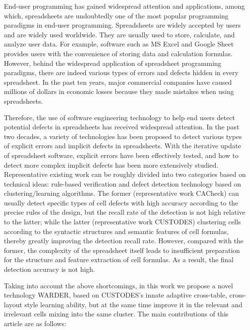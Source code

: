 \begin{englishabstract}

End-user programming has gained widespread attention and applications, among which, spreadsheets are undoubtedly one of the most popular programming paradigms in end-user programming.
Spreadsheets are widely accepted by users and are widely used worldwide. 
They are usually used to store, calculate, and analyze user data. 
For example, software such as MS Excel and Google Sheet provides users with the convenience of storing data and calculation formulas. 
However, behind the widespread application of spreadsheet programming paradigms, there are indeed various types of errors and defects hidden in every spreadsheet. 
In the past ten years, major commercial companies have caused millions of dollars in economic losses because they made mistakes when using spreadsheets.

Therefore, the use of software engineering technology to help end users detect potential defects in spreadsheets has received widespread attention. 
In the past two decades, a variety of technologies has been proposed to detect various types of explicit errors and implicit defects in spreadsheets. 
With the iterative update of spreadsheet software, explicit errors have been effectively tested, and how to detect more complex implicit defects has been more extensively studied. 
Representative existing work can be roughly divided into two categories based on technical ideas: rule-based verification and defect detection technology based on clustering/learning algorithms. The former (representative work CACheck) can usually detect specific types of cell defects with high accuracy according to the precise rules of the design, but the recall rate of the detection is not high relative to the latter; while the latter (representative work CUSTODES) clustering cells according to the syntactic structures and semantic features of cell formulas, thereby greatly improving the detection recall rate. However, compared with the former, the complexity of the spreadsheet itself leads to insufficient preparation for the structure and feature extraction of cell formulas. As a result, the final detection accuracy is not high. 

Taking into account the above shortcomings, in this work we propose a novel technology WARDER, based on CUSTODES's innate adaptive cross-table, cross-layout style learning ability, but at the same time improve it in the relevant and irrelevant cells mixing into the same cluster. The main contributions of this article are as follows:


\end{englishabstract}
